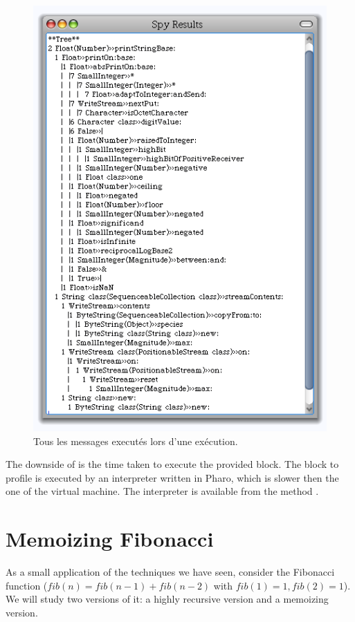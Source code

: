 \documentclass[a4paper,10pt,twoside]{book}
\begin{document}
\begin{figure}
	\begin{center}
	\includegraphics[width=.8\linewidth]{sendTally}
	\caption{Tous les messages execut\'es lors d'une ex\'ecution.}
	\end{center}
\end{figure}

The downside of  is the time taken to execute the provided block. The block to profile is executed by an interpreter written in Pharo, which is slower then the one of the virtual machine. The interpreter is available from the method .

\section{Memoizing Fibonacci}
As a small application of the techniques we have seen, consider the Fibonacci function ($fib (n) = fib (n-1) + fib(n-2)$ with $fib(1)=1, fib(2)=1$). We will study two versions of it: a highly recursive version and a memoizing version.
\end{document}
